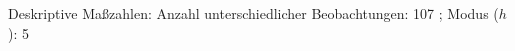 				\label{tableValues:asys04}
				\vspace*{-\baselineskip}
                    \begin{noten}
                	    \note{} Deskriptive Maßzahlen:
                	    Anzahl unterschiedlicher Beobachtungen: 107%
                	    ; 
                	      Modus ($h$): 5
                     \end{noten}


